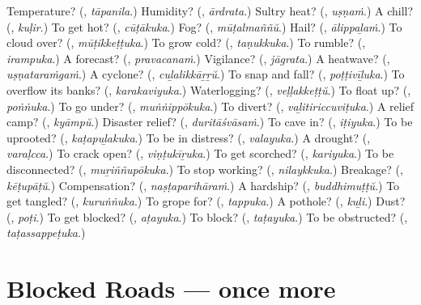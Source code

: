 \begin{tcolorbox}[breakable,colback=teal!4,colframe=teal!35!black,title={Before you move on}]
Temperature? (\textbf{}, \emph{tāpanila}.) Humidity? (\textbf{}, \emph{ārdrata}.) Sultry heat? (\textbf{}, \emph{uṣṇaṁ}.) A chill? (\textbf{}, \emph{kuḷir}.) To get hot? (\textbf{}, \emph{cūṭākuka}.) Fog? (\textbf{}, \emph{mūṭalmaññŭ}.) Hail? (\textbf{}, \emph{ālippaḻaṁ}.) To cloud over? (\textbf{}, \emph{mūṭikkeṭṭuka}.) To grow cold? (\textbf{}, \emph{taṇukkuka}.) To rumble? (\textbf{}, \emph{irampuka}.) A forecast? (\textbf{}, \emph{pravacanaṁ}.) Vigilance? (\textbf{}, \emph{jāgrata}.) A heatwave? (\textbf{}, \emph{uṣṇataraṁgaṁ}.) A cyclone? (\textbf{}, \emph{cuḻalikkāṟṟŭ}.) To snap and fall? (\textbf{}, \emph{poṭṭivīḻuka}.) To overflow its banks? (\textbf{}, \emph{karakaviyuka}.) Waterlogging? (\textbf{}, \emph{veḷḷakkeṭṭŭ}.) To float up? (\textbf{}, \emph{poṅṅuka}.) To go under? (\textbf{}, \emph{muṅṅippōkuka}.) To divert? (\textbf{}, \emph{vaḻitiriccuviṭuka}.) A relief camp? (\textbf{}, \emph{kyāmpŭ}.) Disaster relief? (\textbf{}, \emph{duritāśvāsaṁ}.) To cave in? (\textbf{}, \emph{iṭiyuka}.) To be uprooted? (\textbf{}, \emph{kaṭapuḻakuka}.) To be in distress? (\textbf{}, \emph{valayuka}.) A drought? (\textbf{}, \emph{varaḷcca}.) To crack open? (\textbf{}, \emph{viṇṭukīṟuka}.) To get scorched? (\textbf{}, \emph{kariyuka}.) To be disconnected? (\textbf{}, \emph{muṟiññupōkuka}.) To stop working? (\textbf{}, \emph{nilaykkuka}.) Breakage? (\textbf{}, \emph{kēṭupāṭŭ}.) Compensation? (\textbf{}, \emph{naṣṭaparihāraṁ}.) A hardship? (\textbf{}, \emph{buddhimuṭṭŭ}.) To get tangled? (\textbf{}, \emph{kuruṅṅuka}.) To grope for? (\textbf{}, \emph{tappuka}.) A pothole? (\textbf{}, \emph{kuḻi}.) Dust? (\textbf{}, \emph{poṭi}.) To get blocked? (\textbf{}, \emph{aṭayuka}.) To block? (\textbf{}, \emph{taṭayuka}.) To be obstructed? (\textbf{}, \emph{taṭassappeṭuka}.)
\end{tcolorbox}
\section[(dialogue)]{Blocked Roads — once more}

